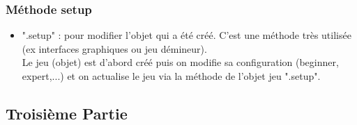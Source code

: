 \documentclass[12pt,a4paper]{article}
\begin{document}
\subsubsection{Méthode setup}
\begin{itemize}
\item ".setup" : pour modifier l'objet qui a été créé. C'est une méthode très utilisée (ex interfaces graphiques ou jeu démineur).\\
Le jeu (objet) est d'abord créé puis on modifie sa configuration (beginner, expert,...) et on actualise le jeu via la méthode de l'objet jeu ".setup".
\end{itemize}

\subsection{Troisième Partie}
\end{document}
